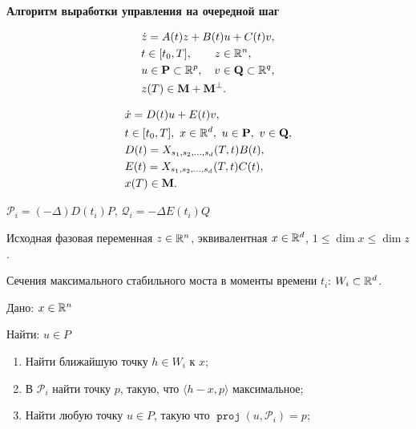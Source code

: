 \documentclass[a4paper,12pt]{article}
\newcommand{\R}[1]{%
  \ifthenelse{\equal{#1}{}}%
  {\mathbb{R}}%
  {\mathbb{R}^{#1}}}
\newcommand{\scalprod}[3][]{#1\langle #2, #3 #1\rangle} %
\DeclareMathOperator{\proj}{\texttt{proj}} %
\begin{document}
  \textbf{Алгоритм выработки управления на очередной шаг}


  \begin{equation}
    \label{eq:OrigGame}
    \begin{aligned}
      & \dot z = A(t)z + B(t)u + C(t)v,\\
      & t \in [t_0, T], \quad \quad z \in \R{n},\\
      & u \in \mathbf P \subset \R{p}, \quad v \in \mathbf Q \subset \R{q}, \\
      & z(T) \in \mathbf M + \mathbf M^\bot.
    \end{aligned}
  \end{equation}

\begin{equation}
  \label{eq:EqGame}
  \begin{aligned}
    & \dot x = D(t)u + E(t)v, \\
    & t \in [t_0, T], \  x \in \R{d}, \  u \in \mathbf P, \  v \in \mathbf Q, \\
    & D(t) = X_{s_1,s_2,\ldots,s_d}(T,t)B(t),  \\
    & E(t) = X_{s_1,s_2,\ldots,s_d}(T,t)C(t),   \\
    & x(T) \in \mathbf M.
  \end{aligned}
\end{equation}


$\mathcal{P}_i = (-\Delta)D(t_i)P$, $\mathcal{Q}_i = -\Delta E(t_i)Q$


  Исходная фазовая переменная $z \in \R{n}$, эквивалентная $x \in \R{d}$, $1 \leqslant \dim x \leqslant \dim z$.

  Сечения максимального стабильного моста в моменты времени $t_i$: $W_i \subset \R{d}$.

  \bigskip

  Дано: $x \in \R{n}$

  Найти: $u \in P$
  \begin{enumerate}
    \item Найти ближайшую точку $h \in W_i$ к $x$;
    \item В $\mathcal{P}_i$ найти точку $p$, такую, что $\scalprod{h-x}{p}$ максимальное;
    \item Найти любую точку $u \in P$, такую что $\proj(u, \mathcal{P}_i) = p$;
  \end{enumerate}
\end{document}
